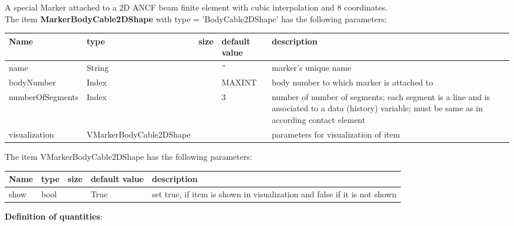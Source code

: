 A special Marker attached to a 2D ANCF beam finite element with cubic interpolation and 8 coordinates.
 \\\vspace{12pt} \noindent The item {\bf MarkerBodyCable2DShape} with type = 'BodyCable2DShape' has the following parameters:\vspace{-1cm}\\ 
\begin{center}
  \footnotesize
  \begin{longtable}{| p{4.5cm} | p{2.5cm} | p{0.5cm} | p{2.5cm} | p{6cm} |}
    \hline
    \bf Name & \bf type & \bf size & \bf default value & \bf description \\ \hline
    name &     String &      &     '' &     marker's unique name\\ \hline
    bodyNumber &     Index &      &     MAXINT &     body number to which marker is attached to\\ \hline
    numberOfSegments &     Index &      &     3 &     number of number of segments; each segment is a line and is associated to a data (history) variable; must be same as in according contact element\\ \hline
    visualization & VMarkerBodyCable2DShape & & & parameters for visualization of item \\ \hline
	  \end{longtable}
	\end{center}
The item VMarkerBodyCable2DShape has the following parameters:\vspace{-1cm}\\ 
\begin{center}
  \footnotesize
  \begin{longtable}{| p{4.5cm} | p{2.5cm} | p{0.5cm} | p{2.5cm} | p{6cm} |}
    \hline
    \bf Name & \bf type & \bf size & \bf default value & \bf description \\ \hline
    show &     bool &      &     True &     set true, if item is shown in visualization and false if it is not shown\\ \hline
	  \end{longtable}
	\end{center}
{\bf Definition of quantities}:\\
\newpage

